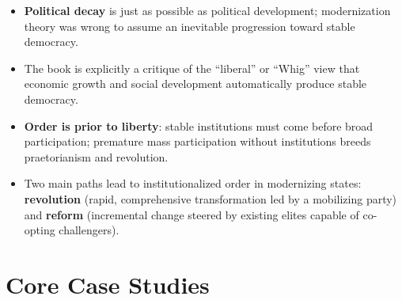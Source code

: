 \documentclass[12pt]{article}
\begin{document}
\begin{itemize}[leftmargin=*, itemsep=4pt]
    \item \textbf{Political decay} is just as possible as political development; modernization theory was wrong to assume an inevitable progression toward stable democracy.
    \item The book is explicitly a critique of the ``liberal'' or ``Whig'' view that economic growth and social development automatically produce stable democracy.
    \item \textbf{Order is prior to liberty}: stable institutions must come before broad participation; premature mass participation without institutions breeds praetorianism and revolution.
    \item Two main paths lead to institutionalized order in modernizing states: \textbf{revolution} (rapid, comprehensive transformation led by a mobilizing party) and \textbf{reform} (incremental change steered by existing elites capable of co-opting challengers).
\end{itemize}

\section{Core Case Studies}
\end{document}
